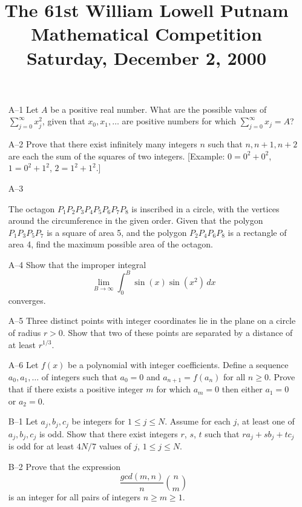 \documentclass[amssymb,twocolumn,pra,10pt,aps]{revtex4-1}
\begin{document}
\title{The 61st William Lowell Putnam Mathematical Competition \\
    Saturday, December 2, 2000}
\maketitle

\begin{itemize}
\item[A--1]
Let $A$ be a positive real number.  What are the possible values of
$\sum_{j=0}^\infty x_j^2$, given that $x_0,x_1,\ldots$ are positive
numbers
for which $\sum_{j=0}^\infty x_j=A$?

\item[A--2]
Prove that there exist infinitely many integers $n$ such that
$n,n+1,n+2$ are each the sum of the squares of two integers.
[Example: $0=0^2+0^2$, $1=0^2+1^2$, $2=1^2+1^2$.]


\item[A--3]

The octagon $P_1P_2P_3P_4P_5P_6P_7P_8$ is inscribed in a circle, with
the
vertices around the circumference in the given order.  Given that the
polygon
$P_1P_3P_5P_7$ is a square of area 5, and the polygon $P_2P_4P_6P_8$ is a
rectangle of area 4, find the maximum possible area of the octagon.

\item[A--4]
Show that the improper integral
\[ \lim_{B\to\infty}\int_{0}^B \sin(x) \sin(x^2)\,dx\]
converges.


\item[A--5]
Three distinct points with integer coordinates lie in the plane on a
circle of radius $r>0$.  Show that two of these points are separated by a
distance of at least $r^{1/3}$.

\item[A--6]
Let $f(x)$ be a polynomial with integer coefficients.  Define a
sequence $a_0,a_1,\ldots$ of integers such that $a_0=0$ and
$a_{n+1}=f(a_n)$
for all $n\geq 0$.  Prove that if there exists a positive integer $m$ for
which $a_m=0$ then either $a_1=0$ or $a_2=0$.

\item[B--1]
Let $a_j,b_j,c_j$ be integers for $1\leq j\leq N$.  Assume for each
$j$, at least one of $a_j,b_j,c_j$ is odd.  Show that there exist integers
$r$, $s$, $t$ such that $ra_j+sb_j+tc_j$ is odd for at least $4N/7$ values
of $j$, $1\leq j\leq N$.

\item[B--2]
Prove that the expression
\[ \frac{gcd(m,n)}{n}\binom{n}{m} \]
is an integer for all pairs of integers $n\geq m\geq 1$.


\end{itemize}
\end{document}
